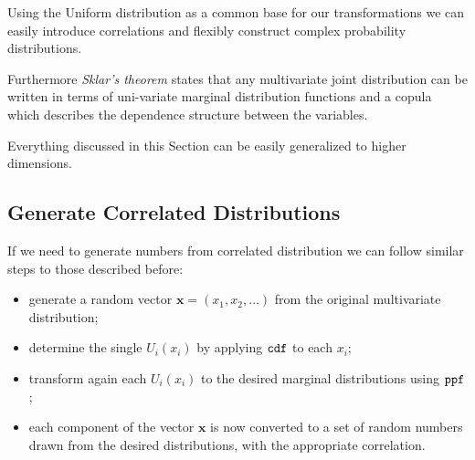 Using the Uniform distribution as a common base for our transformations
we can easily introduce correlations and flexibly construct complex
probability distributions. 

Furthermore \emph{Sklar's theorem} states that any multivariate joint distribution
can be written in terms of uni-variate marginal distribution functions
and a copula which describes the dependence structure between the
variables.

Everything discussed in this Section can be easily generalized to higher dimensions.




\subsection{Generate Correlated Distributions}\label{generate-correlated-distributions}

If we need to generate numbers from correlated distribution we can
follow similar steps to those described before:

\begin{itemize}
\tightlist
\item
  generate a random vector \(\mathbf{x}=(x_1, x_2,\ldots)\) from the
  original multivariate distribution;
\item
  determine the single \(U_i(x_i)\) by applying \(\tt{cdf}\) to each
  \(x_i\);
\item
  transform again each \(U_i(x_i)\) to the desired marginal
  distributions using \(\tt{ppf}\);
\item
  each component of the vector \(\mathbf{x}\) is now converted to a set
  of random numbers drawn from the desired distributions, with the
  appropriate correlation.
\end{itemize}

